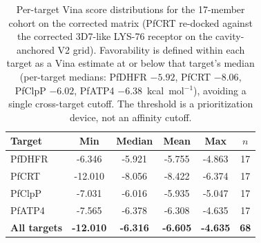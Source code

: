 \begin{table}[ht!]
\centering
\caption{Per-target Vina score distributions for the 17-member cohort on the corrected matrix (PfCRT re-docked against the corrected 3D7-like LYS-76 receptor on the cavity-anchored V2 grid). Favorability is defined within each target as a Vina estimate at or below that target's median (per-target medians: PfDHFR $-5.92$, PfCRT $-8.06$, PfClpP $-6.02$, PfATP4 $-6.38$~kcal~mol$^{-1}$), avoiding a single cross-target cutoff. The threshold is a prioritization device, not an affinity cutoff.}
\label{tab:sm_vina_distributions}
\small
\begin{tabular}{l S[table-format=-1.3] S[table-format=-1.3] S[table-format=-1.3] S[table-format=-1.3] S[table-format=2.0]}
\toprule
Target & {Min} & {Median} & {Mean} & {Max} & {$n$} \\
\midrule
PfDHFR  & -6.346 & -5.921 & -5.755 & -4.863 & 17 \\
PfCRT   & -12.010 & -8.056 & -8.422 & -6.374 & 17 \\
PfClpP  & -7.031 & -6.016 & -5.935 & -5.047 & 17 \\
PfATP4  & -7.565 & -6.378 & -6.308 & -4.635 & 17 \\
\midrule
\textbf{All targets} & \textbf{-12.010} & \textbf{-6.316} & \textbf{-6.605} & \textbf{-4.635} & \textbf{68} \\
\bottomrule
\end{tabular}
\end{table}